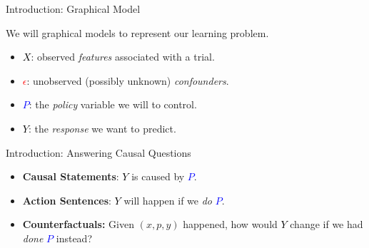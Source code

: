 \documentclass[xcolor={dvipsnames}]{beamer}
\newcommand{\policy}{\mbox{\textcolor{blue}{$P$}}}
\newcommand{\response}{\mbox{\textcolor{black}{$Y$}}}
\newcommand{\confounder}{\mbox{\textcolor{red}{$\epsilon$}}}
\newcommand{\features}{\mbox{\textcolor{black}{$X$}}}
\begin{document}
    \begin{frame}{Introduction: Graphical Model}

        \begin{figure}
            \centering
            
        \end{figure}

        We will graphical models to represent our learning problem.\vspace{0.2cm}
        \begin{itemize}
            \item \features{}: observed \emph{features} associated with a trial.
            \item \confounder{}: unobserved (possibly unknown) \emph{confounders}.
            \item \policy{}: the \emph{policy} variable we will to control.
            \item \response{}: the \emph{response} we want to predict.
        \end{itemize}

    \end{frame}

    \begin{frame}{Introduction: Answering Causal Questions}

        \begin{figure}
            \centering
            
        \end{figure}

        \begin{itemize}
            \item \textbf{Causal Statements}: \response{} is caused by \policy{}.\vspace{0.2cm}
            \item \textbf{Action Sentences}: \response{} will happen if we \emph{do} \policy{}.\vspace{0.2cm}
            \item \textbf{Counterfactuals:} Given $(x, p, y)$ happened, how would \response{} change if we had \emph{done} \policy{} instead?\vspace{0.2cm}
        \end{itemize}

    \end{frame}
\end{document}
